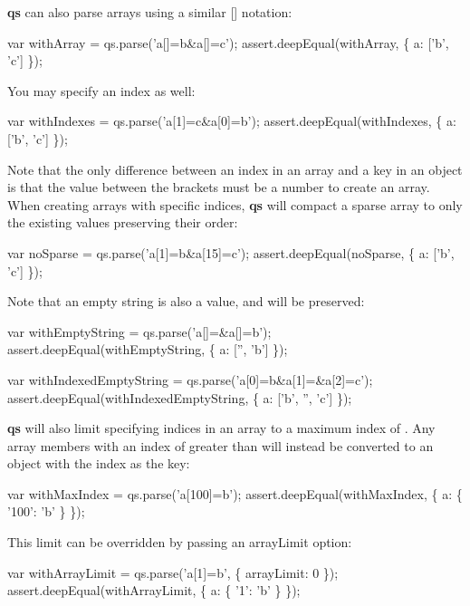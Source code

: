 {\bfseries qs} can also parse arrays using a similar {\ttfamily \mbox{[}\mbox{]}} notation\+:


\begin{DoxyCode}
var withArray = qs.parse('a[]=b&a[]=c');
assert.deepEqual(withArray, \{ a: ['b', 'c'] \});
\end{DoxyCode}


You may specify an index as well\+:


\begin{DoxyCode}
var withIndexes = qs.parse('a[1]=c&a[0]=b');
assert.deepEqual(withIndexes, \{ a: ['b', 'c'] \});
\end{DoxyCode}


Note that the only difference between an index in an array and a key in an object is that the value between the brackets must be a number to create an array. When creating arrays with specific indices, {\bfseries qs} will compact a sparse array to only the existing values preserving their order\+:


\begin{DoxyCode}
var noSparse = qs.parse('a[1]=b&a[15]=c');
assert.deepEqual(noSparse, \{ a: ['b', 'c'] \});
\end{DoxyCode}


Note that an empty string is also a value, and will be preserved\+:


\begin{DoxyCode}
var withEmptyString = qs.parse('a[]=&a[]=b');
assert.deepEqual(withEmptyString, \{ a: ['', 'b'] \});

var withIndexedEmptyString = qs.parse('a[0]=b&a[1]=&a[2]=c');
assert.deepEqual(withIndexedEmptyString, \{ a: ['b', '', 'c'] \});
\end{DoxyCode}


{\bfseries qs} will also limit specifying indices in an array to a maximum index of {}. Any array members with an index of greater than {} will instead be converted to an object with the index as the key\+:


\begin{DoxyCode}
var withMaxIndex = qs.parse('a[100]=b');
assert.deepEqual(withMaxIndex, \{ a: \{ '100': 'b' \} \});
\end{DoxyCode}


This limit can be overridden by passing an {\ttfamily array\+Limit} option\+:


\begin{DoxyCode}
var withArrayLimit = qs.parse('a[1]=b', \{ arrayLimit: 0 \});
assert.deepEqual(withArrayLimit, \{ a: \{ '1': 'b' \} \});
\end{DoxyCode}


